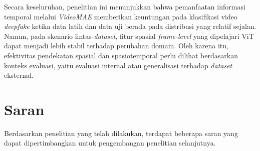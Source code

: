 Secara keseluruhan, penelitian ini menunjukkan bahwa pemanfaatan informasi temporal melalui \textit{VideoMAE} memberikan keuntungan pada klasifikasi video \textit{deepfake} ketika data latih dan data uji berada pada distribusi yang relatif sejalan. Namun, pada skenario lintas-\textit{dataset}, fitur spasial \textit{frame-level} yang dipelajari ViT dapat menjadi lebih stabil terhadap perubahan domain. Oleh karena itu, efektivitas pendekatan spasial dan spasiotemporal perlu dilihat berdasarkan konteks evaluasi, yaitu evaluasi internal atau generalisasi terhadap \textit{dataset} eksternal. \par

\section{Saran} \label{V.Saran}
Berdasarkan penelitian yang telah dilakukan, terdapat beberapa saran yang dapat dipertimbangkan untuk pengembangan penelitian selanjutnya. \par


